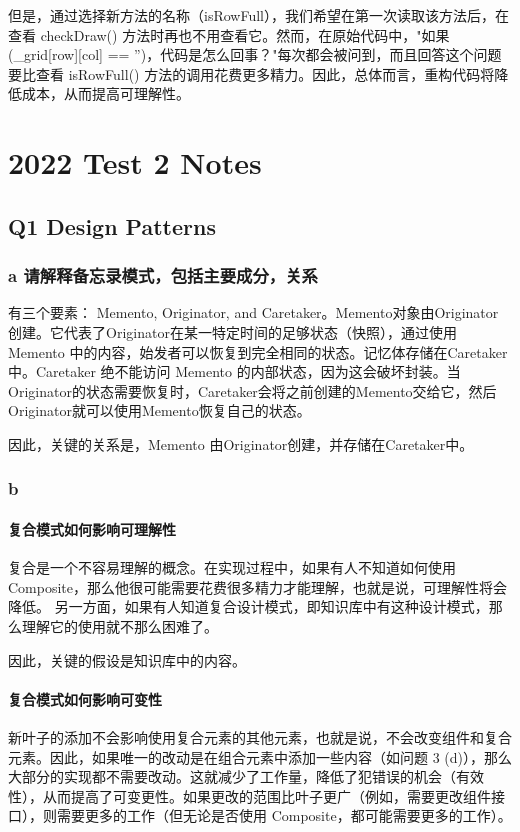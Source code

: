 但是，通过选择新方法的名称（isRowFull），我们希望在第一次读取该方法后，在查看 checkDraw() 方法时再也不用查看它。然而，在原始代码中，"如果 (\_grid[row][col] == '')，代码是怎么回事？"每次都会被问到，而且回答这个问题要比查看 isRowFull() 方法的调用花费更多精力。因此，总体而言，重构代码将降低成本，从而提高可理解性。

\section{2022 Test 2 Notes}

\subsection{Q1 Design Patterns}

\subsubsection{a 请解释备忘录模式，包括主要成分，关系}

有三个要素： Memento, Originator, and Caretaker。Memento对象由Originator创建。它代表了Originator在某一特定时间的足够状态（快照），通过使用 Memento 中的内容，始发者可以恢复到完全相同的状态。记忆体存储在Caretaker中。Caretaker 绝不能访问 Memento 的内部状态，因为这会破坏封装。当Originator的状态需要恢复时，Caretaker会将之前创建的Memento交给它，然后Originator就可以使用Memento恢复自己的状态。

因此，关键的关系是，Memento 由Originator创建，并存储在Caretaker中。

\subsubsection{b}

\paragraph{复合模式如何影响可理解性}
复合是一个不容易理解的概念。在实现过程中，如果有人不知道如何使用 Composite，那么他很可能需要花费很多精力才能理解，也就是说，可理解性将会降低。
另一方面，如果有人知道复合设计模式，即知识库中有这种设计模式，那么理解它的使用就不那么困难了。

因此，关键的假设是知识库中的内容。

\paragraph{复合模式如何影响可变性}
新叶子的添加不会影响使用复合元素的其他元素，也就是说，不会改变组件和复合元素。因此，如果唯一的改动是在组合元素中添加一些内容（如问题 3 (d)），那么大部分的实现都不需要改动。这就减少了工作量，降低了犯错误的机会（有效性），从而提高了可变更性。如果更改的范围比叶子更广（例如，需要更改组件接口），则需要更多的工作（但无论是否使用 Composite，都可能需要更多的工作）。


